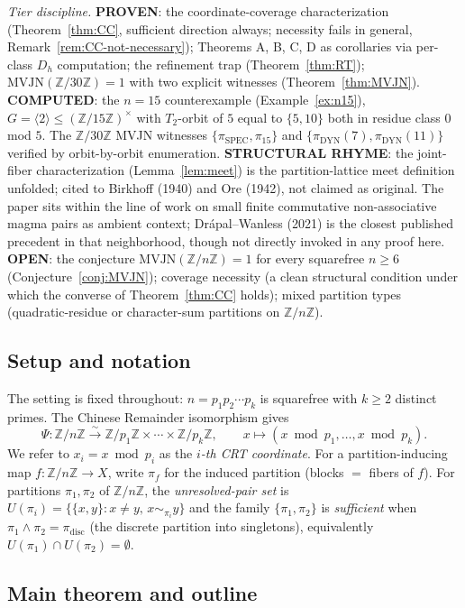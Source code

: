 \documentclass[11pt,reqno]{amsart}
\theoremstyle{plain}
\theoremstyle{definition}
\newcommand{\Z}{\mathbb{Z}}
\newcommand{\Zn}{\Z/n\Z}
\newcommand{\meet}{\wedge}
\newcommand{\disc}{\mathrm{disc}}
\newcommand{\DYN}{\mathrm{DYN}}
\newcommand{\SPEC}{\mathrm{SPEC}}
\begin{document}
\emph{Tier discipline.}
\textbf{PROVEN}: the coordinate-coverage characterization
(Theorem~\ref{thm:CC}, sufficient direction always; necessity fails in
general, Remark~\ref{rem:CC-not-necessary}); Theorems A, B, C, D as
corollaries via per-class $D_h$ computation; the refinement trap
(Theorem~\ref{thm:RT}); $\mathrm{MVJN}(\Z/30\Z) = 1$ with two explicit
witnesses (Theorem~\ref{thm:MVJN}).
\textbf{COMPUTED}: the $n = 15$ counterexample
(Example~\ref{ex:n15}), $G = \langle 2 \rangle \leq (\Z/15\Z)^{\times}$
with $T_2$-orbit of $5$ equal to $\{5, 10\}$ both in residue class $0$
mod $5$. The $\Z/30\Z$ MVJN witnesses $\{\pi_{\SPEC}, \pi_{15}\}$ and
$\{\pi_{\DYN}(7), \pi_{\DYN}(11)\}$ verified by orbit-by-orbit
enumeration.
\textbf{STRUCTURAL RHYME}: the joint-fiber characterization
(Lemma~\ref{lem:meet}) is the partition-lattice meet definition
unfolded; cited to Birkhoff (1940) and Ore (1942), not claimed as
original. The paper sits within the line of work on small finite
commutative non-associative magma pairs as ambient context;
Dr\'apal--Wanless (2021) is the closest published precedent in that
neighborhood, though not directly invoked in any proof here.
\textbf{OPEN}: the conjecture $\mathrm{MVJN}(\Zn) = 1$ for every
squarefree $n \geq 6$ (Conjecture~\ref{conj:MVJN}); coverage
necessity (a clean structural condition under which the converse of
Theorem~\ref{thm:CC} holds); mixed partition types (quadratic-residue
or character-sum partitions on $\Zn$).

\subsection{Setup and notation}

The setting is fixed throughout: $n = p_1 p_2 \cdots p_k$ is
squarefree with $k \geq 2$ distinct primes. The Chinese Remainder
isomorphism gives
\[
\Psi \colon \Zn \xrightarrow{\sim}
\Z/p_1\Z \times \cdots \times \Z/p_k\Z, \qquad
x \mapsto (x \bmod p_1, \ldots, x \bmod p_k).
\]
We refer to $x_i = x \bmod p_i$ as the \emph{$i$-th CRT coordinate}.
For a partition-inducing map $f \colon \Zn \to X$, write $\pi_f$ for
the induced partition (blocks $=$ fibers of $f$). For partitions
$\pi_1, \pi_2$ of $\Zn$, the \emph{unresolved-pair set} is
$U(\pi_i) = \{\{x, y\} : x \neq y, \, x \sim_{\pi_i} y\}$ and the
family $\{\pi_1, \pi_2\}$ is \emph{sufficient} when
$\pi_1 \meet \pi_2 = \pi_{\disc}$ (the discrete partition into
singletons), equivalently $U(\pi_1) \cap U(\pi_2) = \emptyset$.

\subsection{Main theorem and outline}
\end{document}
